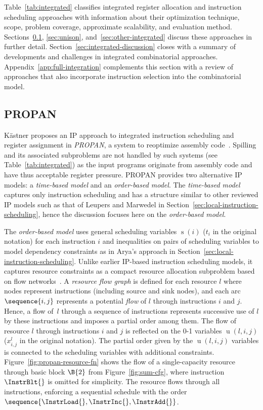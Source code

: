 \documentclass[acmsmall,authorversion,nonacm]{acmart}
\newcommand{\noMathVar}[2]{\operatorname{#1}(#2)}
\newcommand{\var}[2]{$\noMathVar{#1}{#2}$}
\begin{document}
Table~\ref{tab:integrated} classifies integrated register allocation
and instruction scheduling approaches with information about their
optimization technique, scope, problem coverage, approximate
scalability, and evaluation method.
Sections~\ref{sec:propan}, \ref{sec:unison},
and~\ref{sec:other-integrated} discuss these approaches in further
detail.
Section~\ref{sec:integrated-discussion} closes with a summary of
developments and challenges in integrated combinatorial approaches.
Appendix~\ref{app:full-integration} complements this section with a
review of approaches that also incorporate instruction selection into
the combinatorial model.

\subsection{PROPAN}\label{sec:propan}

K\"{a}stner proposes an IP approach to integrated instruction
scheduling and register assignment in \emph{PROPAN}, a system to
reoptimize assembly code~\cite{Kastner2001}.
Spilling and its associated subproblems are not handled by such
systems (see Table~\ref{tab:integrated}) as the input programs
originate from assembly code and have thus acceptable register
pressure.
PROPAN provides two alternative IP models: a \emph{time-based model}
and an \emph{order-based model}.
The \emph{time-based model} captures only instruction scheduling and
has a structure similar to other reviewed IP models such as that of
Leupers and Marwedel in
Section~\ref{sec:local-instruction-scheduling}, hence the discussion
focuses here on the \emph{order-based model}.

The \emph{order-based model} uses general scheduling variables
\var{s}{i} ($t_i$ in the original notation) for each instruction $i$
and inequalities on pairs of scheduling variables to model dependency
constraints as in Arya's approach in
Section~\ref{sec:local-instruction-scheduling}.
Unlike earlier IP-based instruction scheduling models, it captures
resource constraints as a compact resource allocation subproblem based
on flow networks~\cite{Zhang1996,Kastner1999,Kastner2000b}.
A \emph{resource flow graph} is defined for each resource $l$ where
nodes represent instructions (including source and sink nodes), and
each arc $\sequence{i,j}$ represents a potential \emph{flow} of $l$
through instructions $i$ and $j$.
Hence, a flow of~$l$ through a sequence of instructions represents
successive use of $l$ by these instructions and imposes a partial
order among them.
The flow of resource $l$ through instructions $i$ and $j$ is reflected
on the 0-1 variables \var{u}{l,i,j} ($x^l_{i,j}$ in the original
notation).
The partial order given by the \var{u}{l,i,j} variables is connected
to the scheduling variables with additional constraints.
Figure~\ref{fig:propan-resource-fn} shows the flow of a
single-capacity resource through basic block $\B{2}$ from
Figure~\ref{fig:sum-cfg}, where instruction $\InstrBlt{}$ is omitted
for simplicity.
The resource flows through all instructions, enforcing a sequential
schedule with the order $\sequence{\InstrLoad{}, \InstrInc{},
  \InstrAdd{}}$.
\end{document}
